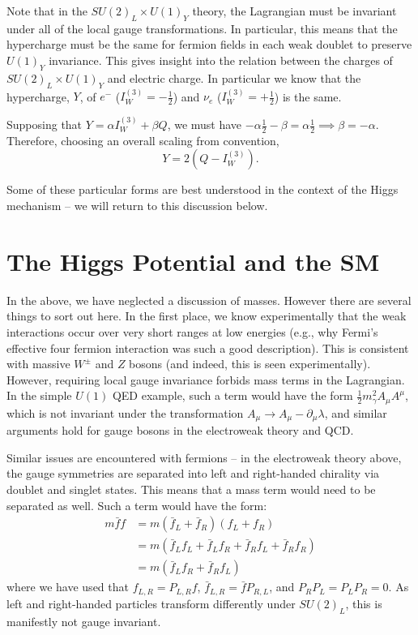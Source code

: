 Note that in the $SU(2)_L \times U(1)_{Y}$ theory, the Lagrangian must be invariant under all of the 
local gauge transformations. In particular, this means that the hypercharge must be the same for 
fermion fields in each weak doublet to preserve $U(1)_{Y}$ invariance. This gives insight 
into the relation between the charges of $SU(2)_L \times U(1)_{Y}$ and electric charge. In particular
we know that the hypercharge, $Y$, of $e^{-}$ ($I_W^{(3)} = -\frac{1}{2}$) and $\nu_{e}$ 
($I_W^{(3)} = +\frac{1}{2}$) is the same. 

Supposing that $Y=\alpha I_{W}^{(3)} + \beta Q$, we must have
$-\alpha \frac{1}{2} - \beta = \alpha \frac{1}{2} \implies \beta = -\alpha$. Therefore, choosing 
an overall scaling from convention,
\begin{equation}
Y = 2(Q-I_{W}^{(3)}).
\end{equation}

Some of these particular forms are best understood in the context of the Higgs mechanism -- we will return to 
this discussion below.


\section{The Higgs Potential and the SM}
In the above, we have neglected a discussion of masses. However there are several things to sort out here.
In the first place, we know experimentally that the weak interactions occur over very short ranges at low 
energies (e.g., why Fermi's effective four fermion interaction was such a good description). This is consistent
with massive $W^{\pm}$ and $Z$ bosons (and indeed, this is seen experimentally). However, requiring local 
gauge invariance forbids mass terms in the Lagrangian. In the simple $U(1)$ QED example, such a term would have 
the form $\frac{1}{2}m_{\gamma}^2A_{\mu}A^{\mu}$, which is not invariant under the transformation $A_{\mu}\rightarrow A_{\mu}-\partial_{\mu}\lambda$, and similar arguments hold for gauge bosons in the electroweak theory and QCD.

Similar issues are encountered with fermions -- in the electroweak theory above, the gauge symmetries are 
separated into left and right-handed chirality via doublet and singlet states. This means that a mass term 
would need to be separated as well. Such a term would have the form:
\begin{align}
m\bar{f}f &= m(\bar{f}_L+\bar{f}_R)(f_L+f_R)\\
&=m(\bar{f}_Lf_{L}+\bar{f}_{L}f_{R}+\bar{f}_{R}f_{L} + \bar{f}_{R}f_{R})\\
&=m(\bar{f}_{L}f_{R}+\bar{f}_{R}f_{L})
\end{align}
where we have used that $f_{L, R} = P_{L,R}f$, $\bar{f}_{L,R} = \bar{f}P_{R,L}$, and $P_{R}P_{L} = P_{L}P_{R} = 0$.
As left and right-handed particles transform differently under $SU(2)_{L}$, this is manifestly not gauge invariant.

